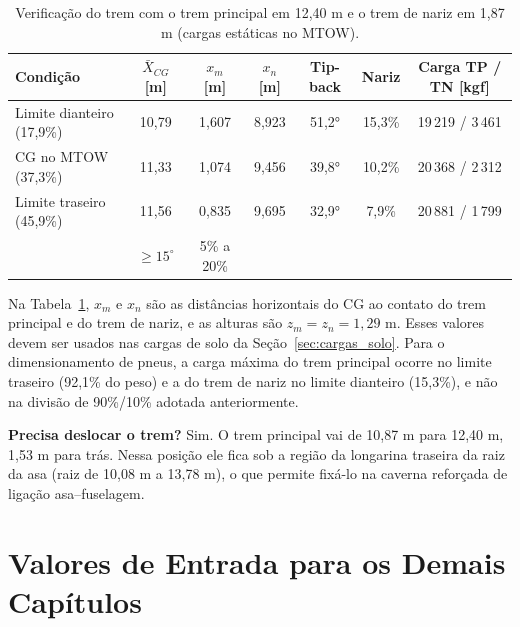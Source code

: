 \begin{table}[H]
  \centering
  \linespread{1}\small
  \setlength{\tabcolsep}{4pt}
  \caption{Verificação do trem com o trem principal em 12,40 m e o trem de nariz em 1,87 m (cargas estáticas no MTOW).}
  \label{tab:cg_trem}
  \begin{tabularx}{\textwidth}{>{\raggedright\arraybackslash}X c c c c c c}
    \toprule
    \textbf{Condição} & $\bar{X}_{CG}$ \textbf{[m]} & $x_m$ \textbf{[m]} & $x_n$ \textbf{[m]} & \textbf{Tip-back} & \textbf{Nariz} & \textbf{Carga TP / TN [kgf]} \\
    \midrule
    Limite dianteiro (17,9\%) & 10,79 & 1,607 & 8,923 & 51,2° & 15,3\% & 19\,219 / 3\,461 \\
    CG no MTOW (37,3\%) & 11,33 & 1,074 & 9,456 & 39,8° & 10,2\% & 20\,368 / 2\,312 \\
    Limite traseiro (45,9\%) & 11,56 & 0,835 & 9,695 & 32,9° & 7,9\% & 20\,881 / 1\,799 \\
    \midrule
    \multicolumn{4}{l}{\textbf{Critério}} & $\geq 15^\circ$ & 5\% a 20\% & \\
    \bottomrule
  \end{tabularx}
\end{table}

Na Tabela~\ref{tab:cg_trem}, $x_m$ e $x_n$ são as distâncias horizontais do CG ao contato do trem principal e do trem de nariz, e as alturas são $z_m = z_n = 1{,}29$ m. Esses valores devem ser usados nas cargas de solo da Seção~\ref{sec:cargas_solo}. Para o dimensionamento de pneus, a carga máxima do trem principal ocorre no limite traseiro (92,1\% do peso) e a do trem de nariz no limite dianteiro (15,3\%), e não na divisão de 90\%/10\% adotada anteriormente.

\textbf{Precisa deslocar o trem?} Sim. O trem principal vai de 10,87 m para 12,40 m, 1,53 m para trás. Nessa posição ele fica sob a região da longarina traseira da raiz da asa (raiz de 10,08 m a 13,78 m), o que permite fixá-lo na caverna reforçada de ligação asa--fuselagem.

\section{Valores de Entrada para os Demais Capítulos}
\label{sec:cg_saidas}

